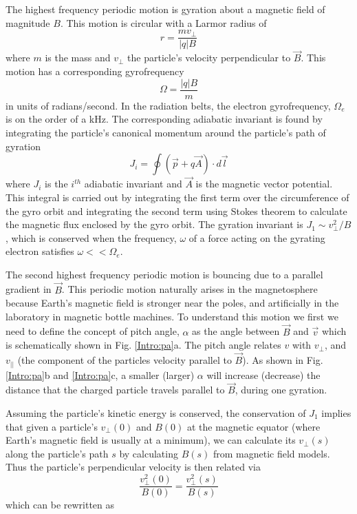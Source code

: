 The highest frequency periodic motion is gyration about a magnetic field of magnitude $B$. This motion is circular with a Larmor radius of 
\begin{equation}
r = \frac{m v_\perp}{|q| B}
\end{equation} where $m$ is the mass and $v_\perp$ the particle's velocity perpendicular to $\vec{B}$. This motion has a corresponding gyrofrequency 
\begin{equation}
\Omega = \frac{|q| B}{m}
\end{equation} in units of radians/second. In the radiation belts, the electron gyrofrequency, $\Omega_e$ is on the order of a kHz. The corresponding adiabatic invariant is found by integrating the particle's canonical momentum around the particle's path of gyration
\begin{equation} \label{J}
J_i = \oint (\vec{p} + q \vec{A}) \cdot d\vec{l}
\end{equation} where $J_i$ is the $i^{th}$ adiabatic invariant and $\vec{A}$ is the magnetic vector potential. This integral is carried out by integrating the first term over the circumference of the gyro orbit and integrating the second term using Stokes theorem to calculate the magnetic flux enclosed by the gyro orbit.  The gyration invariant is $J_1 \sim v_\perp^2 / B$, which is conserved when the frequency, $\omega$ of a force acting on the gyrating electron satisfies $\omega << \Omega_e$.

The second highest frequency periodic motion is bouncing due to a parallel gradient in $\vec{B}$. This periodic motion naturally arises in the magnetosphere because Earth's magnetic field is stronger near the poles, and artificially in the laboratory in magnetic bottle machines. To understand this motion we first we need to define the concept of pitch angle, $\alpha$ as the angle between $\vec{B}$ and $\vec{v}$ which is schematically shown in Fig. \ref{Intro:pa}a. The pitch angle relates $v$ with $v_\perp$, and $v_{||}$ (the component of the particles velocity parallel to $\vec{B}$). As shown in Fig. \ref{Intro:pa}b and \ref{Intro:pa}c, a smaller (larger) $\alpha$ will increase (decrease) the distance that the charged particle travels parallel to $\vec{B}$, during one gyration.

Assuming the particle's kinetic energy is conserved, the conservation of $J_1$ implies that given a particle's $v_\perp(0)$ and $B(0)$ at the magnetic equator (where Earth's magnetic field is usually at a minimum), we can calculate its $v_\perp(s)$ along the particle's path $s$ by calculating $B(s)$ from magnetic field models. Thus the particle's perpendicular velocity is then related via
\begin{equation}
\frac{v_\perp^2 (0)}{B(0)} = \frac{v_\perp^2 (s)}{B(s)}
\end{equation} which can be rewritten as 

